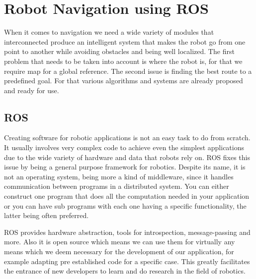 \chapter{Robot Navigation using ROS} \label{ch:BaseWork}


When it comes to navigation we need a wide variety of modules that interconnected produce an intelligent system that makes the robot go from one point to another while avoiding obstacles and being well localized. 
The first problem that needs to be taken into account is where the robot is, for that we require map for a global reference. The second issue is finding the best route to a predefined goal. For that various algorithms and systems are already proposed and ready for use.

\section {ROS}
Creating software for robotic applications is not an easy task to do from scratch. It usually involves very complex code to achieve even the simplest applications due to the wide variety of hardware and data that robots rely on. \ac{ROS} \cite{ros} fixes this issue by being a general purpose framework for robotics. Despite its name, it is not an operating system, being more a kind of middleware, since it  handles communication between programs in a distributed system. You can either construct one program that does all the computation needed in your application or you can have sub programs with each one having a specific functionality, the latter being often preferred.

\ac{ROS} provides hardware abstraction, tools for introspection, message-passing and more. Also it is open source which means we can use them for virtually any means which we deem necessary for the development of our application, for example adapting pre established code for a specific case. This greatly facilitates the entrance of new developers to learn and do research in the field of robotics.

